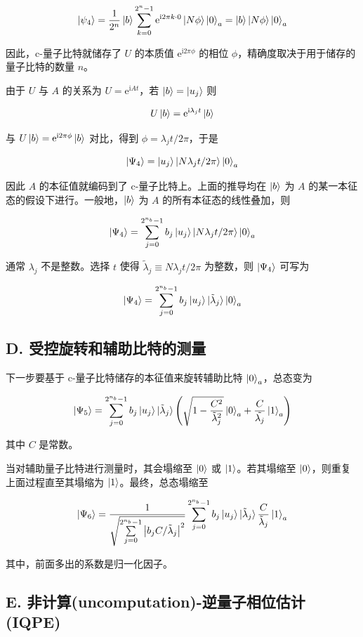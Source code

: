 \documentclass[aps,prl,twocolumn,groupedaddress]{revtex4-2}
\begin{document}
$$
\ket{\psi_4}
=\frac{1 }{2^n } \ket{b} \sum_{k=0}^{2^n-1} \mathrm{e}^{\mathrm{i}2\pi k\cdot 0} \ket{N\phi}\ket{0}_a
=\ket{b}\ket{N\phi}\ket{0}_a
$$

因此，c-量子比特就储存了 $U$ 的本质值 $\mathrm{e}^{\mathrm{i}2\pi \phi} $ 的相位 $\phi$，精确度取决于用于储存的量子比特的数量 $n$。

由于 $U$ 与 $A$ 的关系为 $U = \mathrm{e}^{\mathrm{i}At}$，若 $\ket{b}=\ket{u_j}$ 则

$$
U\ket{b} = \mathrm{e}^{\mathrm{i}\lambda_j t} \ket{b}
$$

与 $U\ket{b}=\mathrm{e}^{\mathrm{i}2\pi \phi}\ket{b}$ 对比，得到 $\phi=\lambda_j t/2\pi$，于是

$$
\ket{\Psi_4}
=\ket{u_j} \ket{N\lambda_j t/2\pi}\ket{0}_a
$$

因此 $A$ 的本征值就编码到了 c-量子比特上。上面的推导均在 $\ket{b}$ 为 $A$ 的某一本征态的假设下进行。一般地，$\ket{b}$ 为 $A$ 的所有本征态的线性叠加，则

$$
\ket{\Psi_4}
=\sum_{j=0}^{2^{n_b}-1} b_j\ket{u_j}\ket{N\lambda_j t/2\pi} \ket{0}_a
$$

通常 $\lambda_j$ 不是整数。选择 $t$ 使得 $\tilde{\lambda}_j\equiv N\lambda_j t/2\pi$ 为整数，则 $\ket{\Psi_4} $ 可写为

$$
\ket{\Psi_4}
=\sum_{j=0}^{2^{n_b}-1} b_j \ket{u_j} \ket{\tilde{\lambda}_j}\ket{0}_a
$$

\subsection{D. 受控旋转和辅助比特的测量}

下一步要基于 c-量子比特储存的本征值来旋转辅助比特 $\ket{0}_a$，总态变为

$$
\ket{\Psi_5}
=\sum_{j=0}^{2^{n_b}-1}b_j\ket{u_j}\ket{\tilde{\lambda}_j}\left(\sqrt{1-\frac{C^2 }{\tilde{\lambda}_j^2 } }\ket{0}_a + \frac{C }{\tilde{\lambda_j} }\ket{1}_a \right)
$$

其中 $C$ 是常数。

当对辅助量子比特进行测量时，其会塌缩至 $\ket{0}$ 或 $\ket{1}$。若其塌缩至 $\ket{0}$，则重复上面过程直至其塌缩为 $\ket{1}$。最终，总态塌缩至

$$
\ket{\Psi_6}
=\frac{1 }{\sqrt{\sum\limits_{j=0}^{2^{n_b}-1}\left|b_j C/\tilde{\lambda}_j \right|^2} }\sum_{j=0}^{2^{n_b}-1}b_j \ket{u_j}\ket{\tilde{\lambda}_j}\frac{C }{\tilde{\lambda}_j }\ket{1}_a
$$

其中，前面多出的系数是归一化因子。

\subsection{E. 非计算(uncomputation)-逆量子相位估计(IQPE)}
\end{document}
